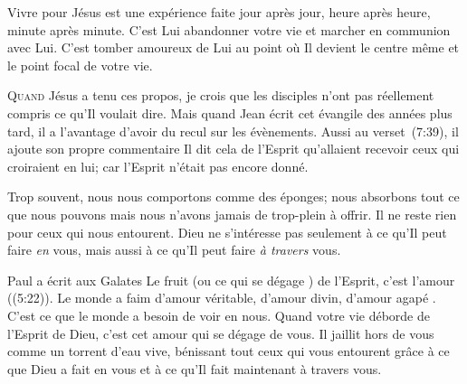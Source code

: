 Vivre pour Jésus est une expérience faite jour après jour,
 heure après heure, minute après minute.
 C'est Lui abandonner votre vie et marcher en communion avec Lui.
 C'est tomber amoureux de Lui au point où Il devient le centre même
 et le point focal de votre vie.

\dvrule







\lettrine{Q}{uand} Jésus a tenu ces propos,
 je crois que les disciples n'ont pas réellement compris
 ce qu'Il voulait dire. Mais quand Jean écrit cet évangile 
 des années plus tard, il a l'avantage d'avoir du recul sur les évènements.
 Aussi au verset~(7:39), il ajoute son propre commentaire\frcolon{}
 \Og Il dit cela de l'Esprit qu'allaient recevoir ceux qui croiraient en lui;
 car l'Esprit n'était pas encore donné. \Fg{}


Trop souvent, nous nous comportons comme des éponges;
 nous absorbons tout ce que nous pouvons mais nous n'avons jamais
 de trop-plein à offrir. Il ne reste rien pour ceux qui nous entourent.
 Dieu ne s'intéresse pas seulement à ce qu'Il peut faire \emph{en} vous,
 mais aussi à ce qu'Il peut faire \emph{à travers} vous.

Paul a écrit aux Galates\frcolon{} 
 \Og Le fruit (ou \Og ce qui se dégage \Fg{}) de l'Esprit,
 c'est l'amour \Fg{} ((5:22)).
 Le monde a faim d'amour véritable, d'amour divin, d'amour \Og agapé \Fg{}.
 C'est ce que le monde a besoin de voir en nous. Quand votre vie déborde
 de l'Esprit de Dieu, c'est cet amour qui se dégage de vous.
 Il jaillit hors de vous comme un torrent d'eau vive,
 bénissant tout ceux qui vous entourent grâce à ce que Dieu
 a fait en vous et à ce qu'Il fait maintenant à travers vous.

